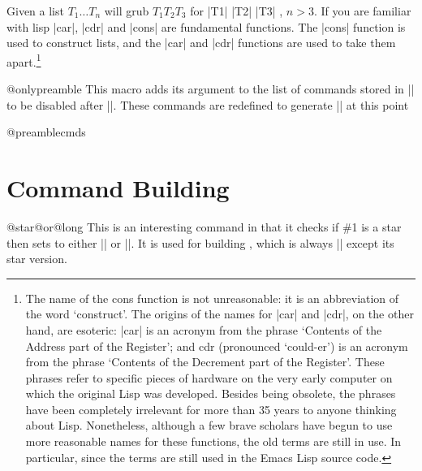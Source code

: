 \begin{macro}{\@carcube}
Given a list $T_1\dots T_n$ \cmd{\@carcube} will grub $T_1 T_2 T_3$ for |T1| |T2| |T3| , $n > 3$. If you are familiar with
lisp |car|, |cdr| and |cons| are fundamental functions. The |cons|  function is used to construct lists, and the |car|
 and |cdr| functions are used to take them apart.\footnote{The name of the cons function is not unreasonable: it is an abbreviation of the word `construct'. The origins of the names for |car| and |cdr|, on the other hand, are esoteric: |car| is an acronym from 
 the phrase `Contents of the Address part of the Register'; and cdr (pronounced `could-er') is an acronym from the phrase 
 `Contents of the Decrement part of the Register'. These phrases refer to specific pieces of hardware on 
 the very early computer on which the original Lisp was developed. Besides being obsolete, the phrases have been completely irrelevant for more than 35 years to anyone thinking about Lisp. Nonetheless, although a few brave scholars have begun to 
 use more reasonable names for these functions, the old terms are still in use. In particular, since the terms 
 are still used in the Emacs Lisp source code.}
\end{macro}


\begin{docCommand}{@onlypreamble}{}
    This macro adds its argument to the list of commands stored in
    |\@preamblecmds| to be
    disabled after ||. These commands are redefined
    to generate |\@notprerr| at this point
\end{docCommand}

\begin{docCommand}{@preamblecmds}{}
\end{docCommand}
\begin{teX}
\def\@preamblecmds{}
\def\@onlypreamble#1{%
  \expandafter\gdef\expandafter\@preamblecmds\expandafter{%
       \@preamblecmds\do#1}}
       
\@onlypreamble\@onlypreamble
\@onlypreamble\@preamblecmds
\end{teX}


\section{Command Building}

\begin{docCommand}{@star@or@long} {  }
This is an interesting command in that it checks if \#1 is a star then sets  to either |\long| or |\relax|. It is used for building , which is always |\long| except its star version.
\end{docCommand}

